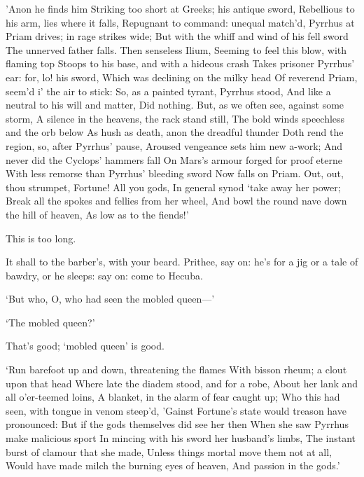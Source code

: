 \documentclass[11pt]{book}
\begin{document}
\begin{Versus}
	'Anon he finds him
   \Locus \textus {+2em}
	Striking too short at Greeks; his antique sword,
	Rebellious to his arm, lies where it falls,
	Repugnant to command: unequal match'd,
	Pyrrhus at Priam drives; in rage strikes wide;
	But with the whiff and wind of his fell sword
	The unnerved father falls. Then senseless Ilium,
	Seeming to feel this blow, with flaming top
	Stoops to his base, and with a hideous crash
	Takes prisoner Pyrrhus' ear: for, lo! his sword,
	Which was declining on the milky head
	Of reverend Priam, seem'd i' the air to stick:
	So, as a painted tyrant, Pyrrhus stood,
	And like a neutral to his will and matter,
	Did nothing.
	But, as we often see, against some storm,
	A silence in the heavens, the rack stand still,
	The bold winds speechless and the orb below
	As hush as death, anon the dreadful thunder
	Doth rend the region, so, after Pyrrhus' pause,
	Aroused vengeance sets him new a-work;
	And never did the Cyclops' hammers fall
	On Mars's armour forged for proof eterne
	With less remorse than Pyrrhus' bleeding sword
	Now falls on Priam.
	Out, out, thou strumpet, Fortune! All you gods,
	In general synod `take away her power;
	Break all the spokes and fellies from her wheel,
	And bowl the round nave down the hill of heaven,
	As low as to the fiends!'
\end{Versus}

\5	This is too long.

\1	\DriveOut* It shall to the barber's, with your beard. Prithee,
	say on: he's for a jig or a tale of bawdry, or he
	sleeps: say on: come to Hecuba.

 `But who, O, who had seen the mobled queen---'

\1	`The mobled queen?'

\5	That's good; `mobled queen' is good.

\begin{Versus}
   \Locus \textus {+2em}
  `Run barefoot up and down, threatening the flames
	With bisson rheum; a clout upon that head
	Where late the diadem stood, and for a robe,
	About her lank and all o'er-teemed loins,
	A blanket, in the alarm of fear caught up;
	Who this had seen, with tongue in venom steep'd,
	'Gainst Fortune's state would treason have
	pronounced:
	But if the gods themselves did see her then
	When she saw Pyrrhus make malicious sport
	In mincing with his sword her husband's limbs,
	The instant burst of clamour that she made,
	Unless things mortal move them not at all,
	Would have made milch the burning eyes of heaven,
	And passion in the gods.'
\end{Versus}
\end{document}
